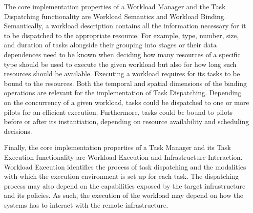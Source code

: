 \documentclass{sig-alternate}
\begin{document}
The core implementation properties of a Workload Manager and the Task
Dispatching functionality are Workload Semantics and Workload Binding.
Semantically, a workload description contains all the information necessary for
it to be dispatched to the appropriate resource. For example, type, number,
size, and duration of tasks alongside their grouping into stages or their data
dependences need to be known when deciding how many resources of a specific type
should be used to execute the given workload but also for how long such
resources should be available. Executing a workload requires for its tasks to be
bound to the resources. Both the temporal and spatial dimensions of the binding
operations are relevant for the implementation of Task Dispatching. Depending on
the concurrency of a given workload, tasks could be dispatched to one or more
pilots for an efficient execution. Furthermore, tasks could be bound to pilots
before or after its instantiation, depending on resource availability and
scheduling decisions.


Finally, the core implementation properties of a Task Manager and its Task
Execution functionality are Workload Execution and Infrastructure Interaction.
Workload Execution identifies the process of task dispatching and the modalities
with which the execution environment is set up for each task. The dispatching
process may also depend on the capabilities exposed by the target infrastructure
and its policies. As such, the execution of the workload may depend on how the
\pilot systems has to interact with the remote infrastructure.

\end{document}
